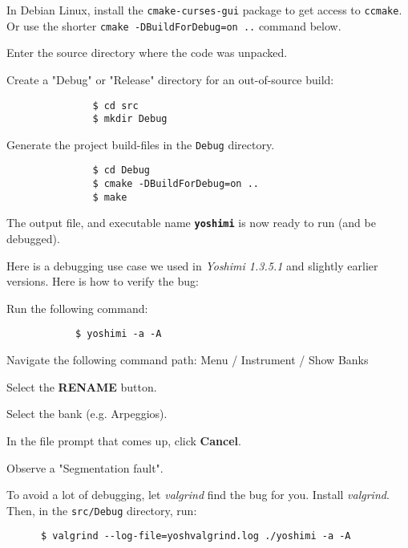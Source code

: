    In Debian Linux, install the \texttt{cmake-curses-gui}
   package to get access to \texttt{ccmake}.  Or use the shorter
   \texttt{cmake -DBuildForDebug=on ..} command below.

   \begin{enumber}
      \item Enter the source directory where the code was unpacked.
      \item Create a "Debug" or "Release" directory for an
            out-of-source build:
            \begin{verbatim}
               $ cd src
               $ mkdir Debug
            \end{verbatim}
      \item Generate the project build-files in the \texttt{Debug}
            directory.
            \begin{verbatim}
               $ cd Debug
               $ cmake -DBuildForDebug=on ..
               $ make
            \end{verbatim}
   \end{enumber}

   The output file, and executable name \textbf{\texttt{yoshimi}}
   is now ready to run (and be debugged).

   Here is a debugging use case we used in \textsl{Yoshimi 1.3.5.1} and
   slightly earlier versions.  Here is how to verify the bug:

   \begin{enumber}
      \item Run the following command:
         \begin{verbatim}
            $ yoshimi -a -A
         \end{verbatim}
      \item Navigate the following command path:
            Menu / Instrument / Show Banks
      \item Select the \textbf{RENAME} button.
      \item Select the bank (e.g. Arpeggios).
      \item In the file prompt that comes up, click \textbf{Cancel}.
      \item Observe a "Segmentation fault".
   \end{enumber}

   To avoid a lot of debugging, let \textsl{valgrind} find the bug for you.
   Install \textsl{valgrind}.  Then, in the \texttt{src/Debug} directory,
   run:

   \begin{verbatim}
      $ valgrind --log-file=yoshvalgrind.log ./yoshimi -a -A
   \end{verbatim}

